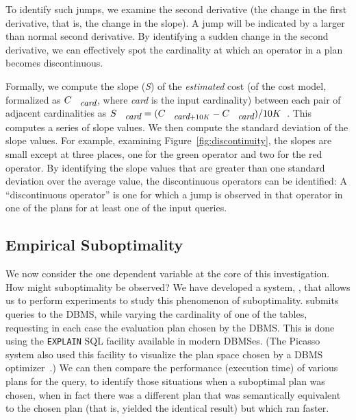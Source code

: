\documentclass[prodmode,acmtods]{acmsmall}
\def\azdb{\doubleblind{\hbox{\sc AZDBLab}}{\hbox{\sc DBLab}}}
\begin{document}
{
To identify such jumps, we examine the second derivative (the change in the
first derivative, that is, the change in the slope). A jump will be indicated by a larger than normal second
derivative. By identifying a sudden change in the second derivative, we can
effectively spot the cardinality at which an operator in a plan becomes
discontinuous.

Formally, we compute the slope ({\em S}) of the {\em estimated} cost
(of the cost model, formalized as $C_{\hbox{\small\em card}}$,
where {\em card} is the input
cardinality) between each pair of adjacent cardinalities as
$S_{\hbox{\small\em card}} = (C_{\hbox{\small\em card} + 10K} -
C_{\hbox{\small\em card}}) / 10K$~.
This computes a series of slope values.
We then compute the standard deviation of the slope
values.  For example, examining Figure~\ref{fig:discontinuity}, the slopes
are small except at three places, one for the green operator and two for the
red operator. By identifying the slope values that are greater than one
standard deviation over the average value, the discontinuous operators can
be identified: A ``discontinuous operator'' is one for which a jump is
observed in that operator in one of the plans for at least one of the input
queries.
}{}

\subsection{Empirical Suboptimality}\label{sec:suboptimality}
We now consider the one dependent variable at the core of this investigation.
How might suboptimality be observed? We have developed a system, \azdb, that
allows us to perform experiments to study this phenomenon of suboptimality.
\hbox{\azdb} submits queries to the \hbox{DBMS}, while varying
the cardinality of one of the tables,
requesting in each case the evaluation plan chosen by the \hbox{DBMS}.
This is done using the
{\tt EXPLAIN} SQL facility available in modern \hbox{DBMSes}. (The Picasso system
also used this facility to visualize the plan space chosen by a \hbox{DBMS}
optimizer~\cite{harish07,Haritsa10}.) We can then compare
the performance (execution time) of various plans for the query, to identify those
situations when a suboptimal plan was chosen, when in fact there was a
different plan that was semantically equivalent to the chosen plan (that is,
yielded the identical result) but which ran faster.
\end{document}
